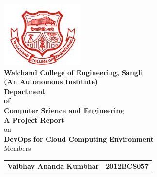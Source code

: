 \documentclass[a4paper,oneside,1,english1pt]{report}
\begin{document}


\begin{titlepage}
	{
		\begin{center}
			
			
			\includegraphics[width=.2\linewidth]{logo/walchand.jpg}\\[.5cm]
			\textbf{\LARGE Walchand College of Engineering, Sangli }\\
			\textbf {(An Autonomous Institute)}\\[.5cm]
			\textbf {\Large Department\\ of\\ Computer Science and Engineering}\\[1cm]
			{ \large \textbf{ A Project Report  } }\\
			on\\
			\textbf{\Large \color{blue}DevOps for Cloud Computing Environment }\\[1cm]

			
			\iffalse
			\large  {Members}\\[1cm]
			{\setlength{\tabcolsep}{30pt}
				\renewcommand{\arraystretch}{1.5}
				\begin{tabular}{ll}
					\large{\textbf{Vaibhav Ananda Kumbhar} } & \large{\textbf{2012BCS057}} 
					

\end{tabular}}
\end{center}}
\end{titlepage}
\end{document}
